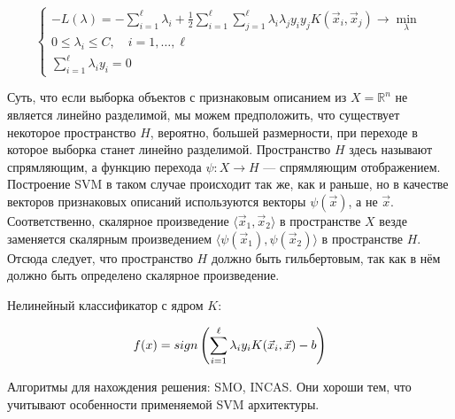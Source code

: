 \begin{equation*}
\begin{cases}
    -L(\lambda) = -\sum\limits_{i=1}^\ell \lambda_i + \frac{1}{2} \sum\limits_{i=1}^\ell \sum\limits_{j=1}^\ell \lambda_i \lambda_j y_i y_j K(\vec{x}_i, \vec{x}_j) \to \min\limits_\lambda \\
    0 \leq \lambda_i \leq C, \quad i = 1, \ldots, \ell \\
    \sum\limits_{i=1}^\ell \lambda_i y_i = 0
\end{cases}
\end{equation*}

Суть, что если выборка объектов с признаковым описанием из $X = \mathbb{R}^n$ не является линейно разделимой, мы можем предположить, что существует некоторое пространство $H$, вероятно, большей размерности, при переходе в которое выборка станет линейно разделимой. Пространство $H$ здесь называют спрямляющим, а функцию перехода $\psi : X \to H$ — спрямляющим отображением. Построение SVM в таком случае происходит так же, как и раньше, но в качестве векторов признаковых описаний используются векторы $\psi(\vec{x})$, а не $\vec{x}$. Соответственно, скалярное произведение $\langle \vec{x}_1, \vec{x}_2 \rangle$ в пространстве $X$ везде заменяется скалярным произведением $\langle \psi(\vec{x}_1), \psi(\vec{x}_2) \rangle$ в пространстве $H$. Отсюда следует, что пространство $H$ должно быть гильбертовым, так как в нём должно быть определено скалярное произведение.

\bigskip
Нелинейный классификатор с ядром $K$:

$$f(x) = sign \left(\sum\limits_{i=1}^\ell \lambda_i y_i K(\vec{x}_i, \vec{x})\color{black} - b\right)$$

\bigskip
Алгоритмы для нахождения решения: SMO, INCAS. Они хороши тем, что учитывают особенности применяемой SVM архитектуры.














